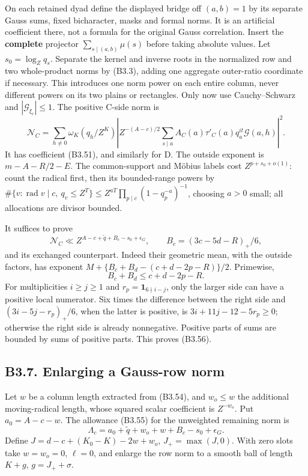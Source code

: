 \documentclass[11pt,a4paper]{article}
\begin{document}
On each retained dyad define the displayed bridge off \((a,\allowbreak{}b)=1\) by its
separate Gauss sums, fixed bicharacter, masks and formal norms. It is an
artificial coefficient there, not a formula for the original Gauss
correlation. Insert the \textbf{complete} projector
\(\sum_{s\mid(a,\allowbreak{}b)}\mu(s)\) before taking absolute values. Let
\(s_0=\log_Zq_s\). Separate the kernel and inverse roots in the
normalized row and two whole-product norms by (B3.3), adding one
aggregate outer-ratio coordinate if necessary. This introduces one norm
power on each entire column, never different powers on its two plains or
rectangles. Only now use Cauchy--Schwarz and
\(|\mathcal G_{\xi_r}|\le1\). The positive C-side norm is \[
\mathcal N_C=\sum_{h\ne0}\omega_K(q_h/Z^K)
 \left|Z^{-(A-c)/2}\sum_{s\mid a}A_C(a)\tau'_C(a)q_a^{it}\mathcal G(a,h)\right|^2.
\tag{B3.54}
\] It has coefficient (B3.51), and similarly for D. The outside exponent
is \(m-A-R/2-E\). The common-support and Möbius labels cost
\(Z^{p+s_0+o(1)}\): count the radical first, then its bounded-range
powers by
\(\#\{v:\operatorname{rad}v\mid c,\allowbreak{}\ q_v\le Z^T\}\le Z^{aT}\prod_{p\mid c}(1-q_p^{-a})^{-1}\),
choosing \(a>0\) small; all allocations are divisor bounded.

It suffices to prove \[
\mathcal N_C\ll Z^{A-c+\widetilde q+B_c-s_0+\epsilon_G},
\qquad B_c=(3c-5d-R)_+/6,
\tag{B3.55}
\] and its exchanged counterpart. Indeed their geometric mean, with the
outside factors, has exponent \(M+\{B_c+B_d-(c+d-2p-R)\}/2\). Primewise,
\[
B_c+B_d\le c+d-2p-R.
\tag{B3.56}
\] For multiplicities \(i\ge j\ge1\) and \(r_p=\mathbf1_{6\nmid i-j}\),
only the larger side can have a positive local numerator. Six times the
difference between the right side and \((3i-5j-r_p)_+/6\), when the
latter is positive, is \(3i+11j-12-5r_p\ge0\); otherwise the right side
is already nonnegative. Positive parts of sums are bounded by sums of
positive parts. This proves (B3.56).

\hypertarget{b3.7.-enlarging-a-gauss-row-norm}{%
\subsection{B3.7. Enlarging a Gauss-row
norm}\label{b3.7.-enlarging-a-gauss-row-norm}}

Let \(w\) be a column length extracted from (B3.54), and \(w_o\le w\)
the additional moving-radical length, whose squared scalar coefficient
is \(Z^{-w_o}\). Put \(a_0=A-c-w\). The allowance (B3.55) for the
unweighted remaining norm is \[
\Lambda_c=a_0+\widetilde q+w_o+w+B_c-s_0+\epsilon_G.
\tag{B3.57}
\] Define \(J=d-c+(K_0-K)-2w+w_o\), \(J_+=\max(J,\allowbreak{}0)\). With zero slots
take \(w=w_o=0\), \(\ell=0\), and enlarge the row norm to a smooth ball
of length \(K+g\), \(g=J_++\sigma\).
\end{document}
